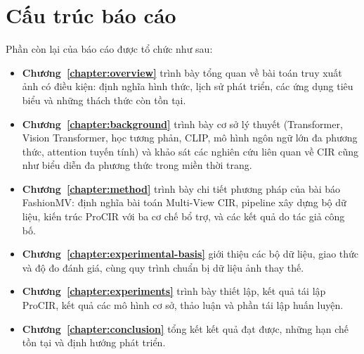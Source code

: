 \section{Cấu trúc báo cáo}

Phần còn lại của báo cáo được tổ chức như sau:
\begin{itemize}
    \item \textbf{Chương~\ref{chapter:overview}} trình bày tổng quan về bài toán truy xuất ảnh có điều kiện: định nghĩa hình thức, lịch sử phát triển, các ứng dụng tiêu biểu và những thách thức còn tồn tại.
    \item \textbf{Chương~\ref{chapter:background}} trình bày cơ sở lý thuyết (Transformer, Vision Transformer, học tương phản, CLIP, mô hình ngôn ngữ lớn đa phương thức, attention tuyến tính) và khảo sát các nghiên cứu liên quan về CIR cũng như biểu diễn đa phương thức trong miền thời trang.
    \item \textbf{Chương~\ref{chapter:method}} trình bày chi tiết phương pháp của bài báo FashionMV: định nghĩa bài toán Multi-View CIR, pipeline xây dựng bộ dữ liệu, kiến trúc ProCIR với ba cơ chế bổ trợ, và các kết quả do tác giả công bố.
    \item \textbf{Chương~\ref{chapter:experimental-basis}} giới thiệu các bộ dữ liệu, giao thức và độ đo đánh giá, cùng quy trình chuẩn bị dữ liệu ảnh thay thế.
    \item \textbf{Chương~\ref{chapter:experiments}} trình bày thiết lập, kết quả tái lập ProCIR, kết quả các mô hình cơ sở, thảo luận và phần tái lập huấn luyện.
    \item \textbf{Chương~\ref{chapter:conclusion}} tổng kết kết quả đạt được, những hạn chế tồn tại và định hướng phát triển.
\end{itemize}
